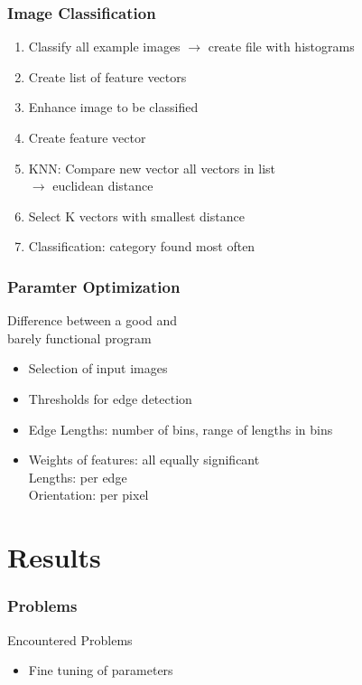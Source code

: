 \documentclass{beamer}
\begin{document}
\begin{frame}
	\frametitle{Image Classification}
	\begin{enumerate}
		\item Classify all example images $\rightarrow$ create file with histograms
		\item Create list of feature vectors
		\item Enhance image to be classified
		\item Create feature vector
		\item KNN: Compare new vector all vectors in list\\
		$\rightarrow$ euclidean distance\\
		\item Select K vectors with smallest distance
		\item Classification: category found most often
	\end{enumerate}
	
\end{frame}

\begin{frame}
	\frametitle{Paramter Optimization}
	\begin{block}{}
	Difference between a good and \\barely functional program 
	\end{block}
	\begin{itemize}
		\item Selection of input images
		\item Thresholds for edge detection
		\item Edge Lengths: number of bins, range of lengths in bins
		\item Weights of features:  all equally significant
		\\Lengths: per edge
		\\Orientation: per pixel
		
	\end{itemize}
	
\end{frame}

\section{Results}
\begin{frame}
	\frametitle{Problems}
    \begin{block}{Encountered Problems}
	    \begin{itemize}
		    \item Fine tuning of parameters
	    \end{itemize}
    \end{block}
\end{frame}
\end{document}
